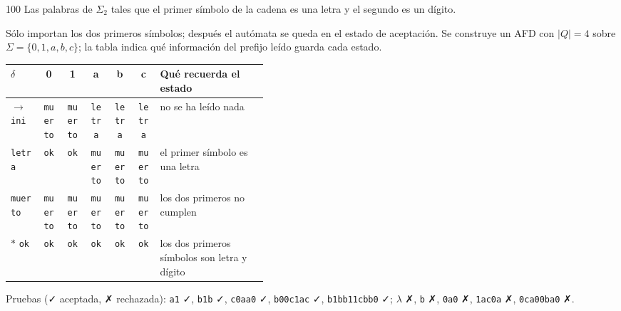 \documentclass[11pt]{article}
\begin{document}
\begin{ejercicio}{100}{}
Las palabras de $\Sigma_2$ tales que el primer símbolo de la cadena es una letra y el segundo es un dígito.
\end{ejercicio}
\proc Sólo importan los dos primeros símbolos; después el autómata se queda en el estado de aceptación. Se construye un AFD con $|Q| = 4$ sobre $\Sigma = \{0, 1, a, b, c\}$; la tabla indica qué información del prefijo leído guarda cada estado.
\begin{center}\small\begin{tabular}{lcccccp{0.42\linewidth}}\toprule
$\delta$ & 0 & 1 & a & b & c & Qué recuerda el estado \\\midrule
$\to$ \texttt{ini} & \texttt{muerto} & \texttt{muerto} & \texttt{letra} & \texttt{letra} & \texttt{letra} & no se ha leído nada \\
 \texttt{letra} & \texttt{ok} & \texttt{ok} & \texttt{muerto} & \texttt{muerto} & \texttt{muerto} & el primer símbolo es una letra \\
 \texttt{muerto} & \texttt{muerto} & \texttt{muerto} & \texttt{muerto} & \texttt{muerto} & \texttt{muerto} & los dos primeros no cumplen \\
$*$ \texttt{ok} & \texttt{ok} & \texttt{ok} & \texttt{ok} & \texttt{ok} & \texttt{ok} & los dos primeros símbolos son letra y dígito \\
\bottomrule\end{tabular}\end{center}
Pruebas (✓ aceptada, ✗ rechazada): \texttt{a1} ✓, \texttt{b1b} ✓, \texttt{c0aa0} ✓, \texttt{b00c1ac} ✓, \texttt{b1bb11cbb0} ✓; $\lambda$ ✗, \texttt{b} ✗, \texttt{0a0} ✗, \texttt{1ac0a} ✗, \texttt{0ca00ba0} ✗.
\end{document}
